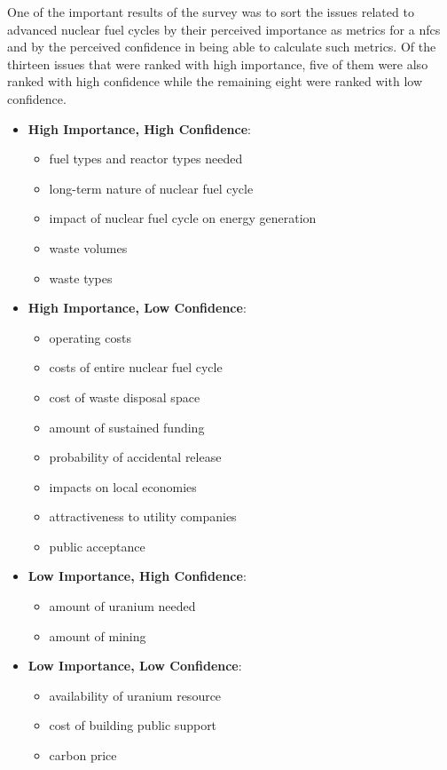 One of the important results of the survey was to sort the issues related to
advanced nuclear fuel cycles by their perceived importance as metrics for a
\gls{nfcs} and by the perceived confidence in being able to calculate such
metrics.  Of the thirteen issues that were ranked with high importance, five
of them were also ranked with high confidence while the remaining eight were
ranked with low confidence.

\begin{itemize}
\item \textbf{High Importance, High Confidence}:
  \begin{itemize}
  \item fuel types and reactor types needed
  \item long-term nature of nuclear fuel cycle
  \item impact of nuclear fuel cycle on energy generation
  \item waste volumes
  \item waste types
  \end{itemize}
\item \textbf{High Importance, Low Confidence}:
  \begin{itemize}
  \item operating costs
  \item costs of entire nuclear fuel cycle
  \item cost of waste disposal space
  \item amount of sustained funding
  \item probability of accidental release
  \item impacts on local economies
  \item attractiveness to utility companies
  \item public acceptance
  \end{itemize}
\item \textbf{Low Importance, High Confidence}:
  \begin{itemize}
  \item amount of uranium needed
  \item amount of mining
  \end{itemize}
\item \textbf{Low Importance, Low Confidence}:
  \begin{itemize}
  \item availability of uranium resource
  \item cost of building public support
  \item carbon price
  \end{itemize}
\end{itemize}

